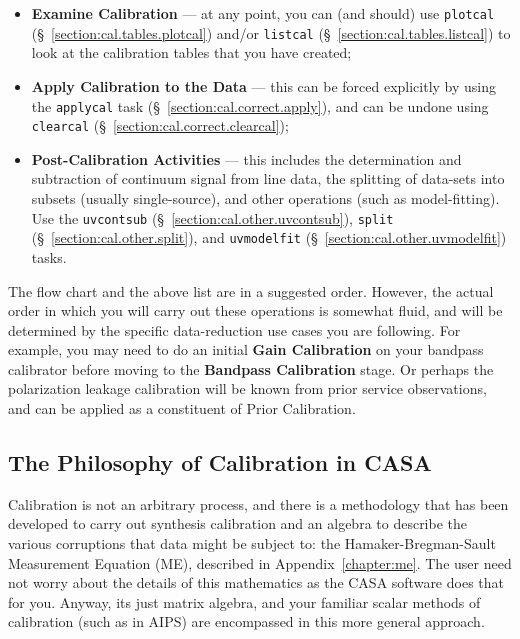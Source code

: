 \begin{itemize}
      {\tt smoothcal} (\S~\ref{section:cal.tables.smooth})
      tasks;
   \item {\bf Examine Calibration} --- at any point, you can (and 
      should) use {\tt plotcal} (\S~\ref{section:cal.tables.plotcal}) 
      and/or {\tt listcal} (\S~\ref{section:cal.tables.listcal})
      to look at the calibration tables that you have created;
   \item {\bf Apply Calibration to the Data} --- this can be forced
      explicitly by using the {\tt applycal} task
      (\S~\ref{section:cal.correct.apply}), and can be undone using
      {\tt clearcal} (\S~\ref{section:cal.correct.clearcal});
   \item {\bf Post-Calibration Activities} --- this includes the
      determination and subtraction of continuum signal from line
      data, the splitting of data-sets into subsets (usually
      single-source), and other operations (such as model-fitting).
      Use the {\tt uvcontsub} (\S~\ref{section:cal.other.uvcontsub}),
      {\tt split} (\S~\ref{section:cal.other.split}),
      and {\tt uvmodelfit} (\S~\ref{section:cal.other.uvmodelfit})
      tasks.
\end{itemize}

The flow chart and the above list are in a suggested order.  However,
the actual order in which you will carry out these operations is
somewhat fluid, and will be determined by the specific data-reduction
use cases you are following.  For example, you may need to do an
initial {\bf Gain Calibration} on your bandpass calibrator before
moving to the {\bf Bandpass Calibration} stage.  Or perhaps the
polarization leakage calibration will be known from prior service 
observations, and can be applied as a constituent of Prior Calibration.

\subsection{The Philosophy of Calibration in CASA}
\label{section:cal.flow.philo}

Calibration is not an arbitrary process, and there is
a methodology that has been developed to carry out synthesis
calibration and an algebra to describe the various corruptions
that data might be subject to: the Hamaker-Bregman-Sault Measurement
Equation (ME), described in Appendix~\ref{chapter:me}.
The user need not worry about the details of this mathematics
as the CASA software does that for you.  Anyway, its just
matrix algebra, and your familiar scalar methods of calibration
(such as in AIPS) are encompassed in this more general approach.

